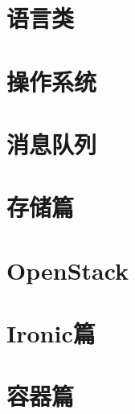\documentclass[newfloat,tikz,usenames,dvipsnames,svgnames,table,b5paper,cache=false]{book}
\begin{document}
\part{语言类}


%

\part{操作系统}





\part{消息队列}

\part{存储篇}


\part{OpenStack}

\part{Ironic篇}





\part{容器篇}




\end{document}
